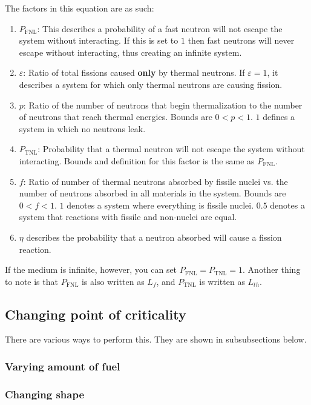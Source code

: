 \documentclass{article}
\begin{document}
\begin{multicols*}{2}
    The factors in this equation are as such:
    \begin{enumerate}
      \item $P_\mathrm{FNL}$: This describes a probability of a
      fast neutron will not escape the system without interacting. If
      this is set to $1$ then fast neutrons will never escape without interacting,
      thus creating an infinite system.
      \item $\varepsilon$: Ratio of total fissions caused \textbf{only} by
      thermal neutrons. If $\varepsilon=1$, it describes a system for which only
      thermal neutrons are causing fission.
      \item $p$: Ratio of the number of neutrons that begin thermalization to
      the number of neutrons that reach thermal energies. Bounds are $0 < p < 1$.
      $1$ defines a system in which no neutrons leak.
      \item $P_\mathrm{TNL}$: Probability that a thermal neutron will not escape
      the system without interacting. Bounds and definition for this factor is the same
      as $P_\mathrm{FNL}$.
      \item $f$: Ratio of number of thermal neutrons absorbed by fissile nuclei vs. the
      number of neutrons absorbed in all materials in the system. Bounds are $0 < f < 1$.
      $1$ denotes a system where everything is fissile nuclei. $0.5$ denotes a system that
      reactions with fissile and non-nuclei are equal.
      \item $\eta$ describes the probability that a neutron absorbed will cause a fission reaction.
    \end{enumerate}

    If the medium is infinite, however, you can set $P_\mathrm{FNL} = P_\mathrm{TNL} = 1$. Another
    thing to note is that $P_\mathrm{FNL}$ is also written as $L_f$, and $P_\mathrm{TNL}$ is written
    as $L_{th}$.

    \subsection{Changing point of criticality}
    There are various ways to perform this. They are shown in subsubsections below.

    \subsubsection*{Varying amount of fuel}
    \subsubsection*{Changing shape}

\end{multicols*}
\end{document}
